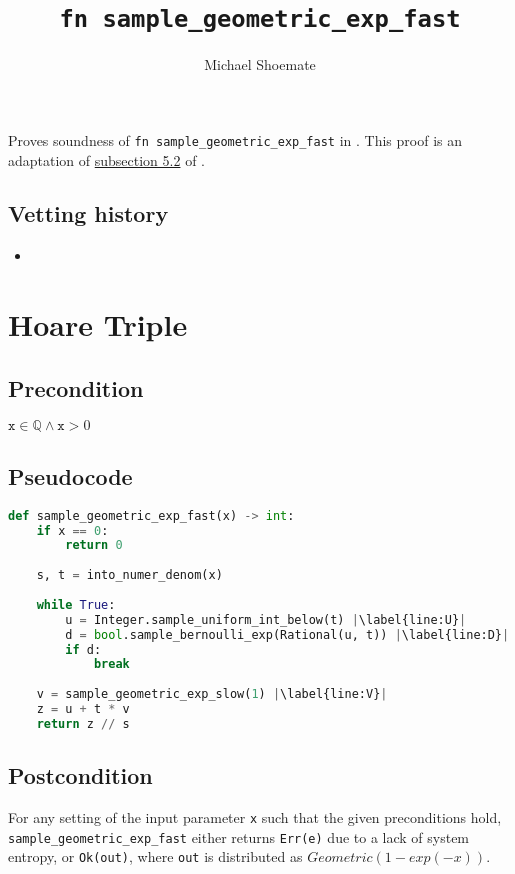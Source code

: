 \documentclass{article}
\title{\texttt{fn sample\_geometric\_exp\_fast}}
\author{Michael Shoemate}
\begin{document}
\maketitle

\contrib
Proves soundness of \texttt{fn sample\_geometric\_exp\_fast} in .
This proof is an adaptation of \href{https://arxiv.org/pdf/2004.00010.pdf#subsection.5.2}{subsection 5.2} of \cite{CKS20}.

\subsection*{Vetting history}
\begin{itemize}
    \item {}
\end{itemize}

\section{Hoare Triple}
\subsection*{Precondition}
$\texttt{x} \in \mathbb{Q} \land \texttt{x} > 0$

\subsection*{Pseudocode}        
\begin{lstlisting}[language=Python, escapechar=|]
def sample_geometric_exp_fast(x) -> int:
    if x == 0:
        return 0
    
    s, t = into_numer_denom(x)
    
    while True:
        u = Integer.sample_uniform_int_below(t) |\label{line:U}|
        d = bool.sample_bernoulli_exp(Rational(u, t)) |\label{line:D}|
        if d:
            break
        
    v = sample_geometric_exp_slow(1) |\label{line:V}|
    z = u + t * v
    return z // s
\end{lstlisting}

\subsection*{Postcondition}
\label{postcondition}
For any setting of the input parameter \texttt{x} such that the given preconditions hold, \\
\texttt{sample\_geometric\_exp\_fast} either returns \texttt{Err(e)} due to a lack of system entropy,
or \texttt{Ok(out)}, where \texttt{out} is distributed as $Geometric(1 - exp(-x))$.
\end{document}
